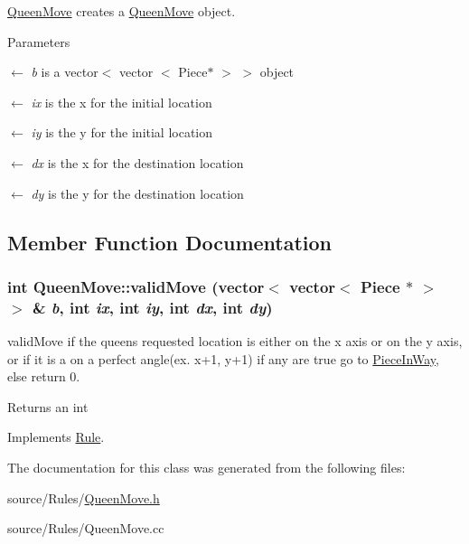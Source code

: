 \hyperlink{classQueenMove}{QueenMove} creates a \hyperlink{classQueenMove}{QueenMove} object. 
\begin{DoxyParams}{Parameters}
\item[\mbox{$\leftarrow$} {\em b}]is a vector$<$ vector $<$ Piece$\ast$ $>$ $>$ object \item[\mbox{$\leftarrow$} {\em ix}]is the x for the initial location \item[\mbox{$\leftarrow$} {\em iy}]is the y for the initial location \item[\mbox{$\leftarrow$} {\em dx}]is the x for the destination location \item[\mbox{$\leftarrow$} {\em dy}]is the y for the destination location \end{DoxyParams}


\subsection{Member Function Documentation}
\hypertarget{classQueenMove_a20dad2546b24626a9c00e5c3b3369065}{
\subsubsection[{validMove}]{\setlength{\rightskip}{0pt plus 5cm}int QueenMove::validMove (vector$<$ vector$<$ {\bf Piece} $\ast$ $>$ $>$ \& {\em b}, \/  int {\em ix}, \/  int {\em iy}, \/  int {\em dx}, \/  int {\em dy})}}
\label{classQueenMove_a20dad2546b24626a9c00e5c3b3369065}


validMove if the queens requested location is either on the x axis or on the y axis, or if it is a on a perfect angle(ex. x+1, y+1) if any are true go to \hyperlink{classPieceInWay}{PieceInWay}, else return 0. \begin{DoxyReturn}{Returns}
an int 
\end{DoxyReturn}


Implements \hyperlink{classRule}{Rule}.

The documentation for this class was generated from the following files:\begin{DoxyCompactItemize}
\item 
source/Rules/\hyperlink{QueenMove_8h}{QueenMove.h}\item 
source/Rules/QueenMove.cc\end{DoxyCompactItemize}

